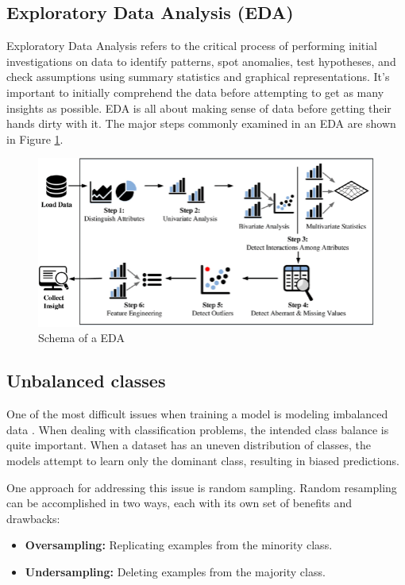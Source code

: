 \subsection{Exploratory Data Analysis (EDA)} \label{4eda}

Exploratory Data Analysis refers to the critical process of performing initial investigations on data to identify patterns, spot anomalies, test hypotheses, and check assumptions using summary statistics and graphical representations. It's important to initially comprehend the data before attempting to get as many insights as possible. EDA is all about making sense of data before getting their hands dirty with it. The major steps commonly examined in an EDA are shown in Figure \ref{fig:eda}.

\begin{figure}[H]
\centering
\includegraphics[scale=0.4]{img/EDAschema.PNG}
\caption{Schema of a EDA}
\label{fig:eda}
\end{figure}

\subsection{Unbalanced classes} \label{3unbclass}

One of the most difficult issues when training a model is modeling imbalanced data \cite{smote1}. When dealing with classification problems, the intended class balance is quite important. When a dataset has an uneven distribution of classes, the models attempt to learn only the dominant class, resulting in biased predictions.

One approach for addressing this issue is random sampling. Random resampling can be accomplished in two ways, each with its own set of benefits and drawbacks:

\begin{itemize}
    \item \textbf{Oversampling:} Replicating examples from the minority class.
    \item \textbf{Undersampling:} Deleting examples from the majority class.
\end{itemize}


